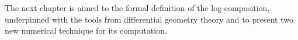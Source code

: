 The next chapter is aimed to the formal definition of the log-composition, underpinned with the tools from differential geometry theory and to present two new numerical technique for its computation.







%
%
